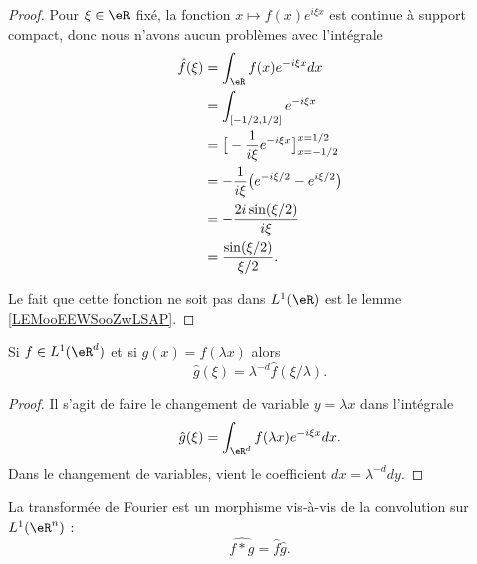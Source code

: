 \begin{proof}
	Pour \( \xi\in \eR\) fixé, la fonction \( x\mapsto f(x) e^{i\xi x}\) est continue à support compact, donc nous n'avons aucun problèmes avec l'intégrale
	\begin{subequations}
		\begin{align}
			\hat f(\xi) & =\int_{\eR}f(x) e^{-i\xi x}dx                               \\
			            & =\int_{\mathopen[ -1/2 , 1/2 \mathclose]} e^{-i\xi x}       \\
			            & =\big[ -\frac{1}{ i\xi } e^{-i\xi x} \big]_{x=-1/2}^{x=1/2} \\
			            & =-\frac{1}{ i\xi }\big(  e^{-i\xi /2}- e^{i\xi /2} \big)    \\
			            & =-\frac{ 2i\sin(\xi/2) }{ i\xi }                            \\
			            & =\frac{ \sin(\xi/2) }{ \xi/2 }.
		\end{align}
	\end{subequations}

	Le fait que cette fonction ne soit pas dans \( L^1(\eR)\) est le lemme \ref{LEMooEEWSooZwLSAP}.
\end{proof}

\begin{lemma}       \label{LEMooKGDKooVXSMCn}
	Si \( f\in L^1(\eR^d)\) et si \( g(x)=f(\lambda x)\) alors
	\begin{equation}
		\hat g(\xi)=\lambda^{-d}\hat f(\xi/\lambda).
	\end{equation}
\end{lemma}

\begin{proof}
	Il s'agit de faire le changement de variable \( y=\lambda x\) dans l'intégrale
	\begin{equation}
		\hat g(\xi)=\int_{\eR^d}f(\lambda x) e^{-i\xi x}dx.
	\end{equation}
	Dans le changement de variables, vient le coefficient \( dx=\lambda^{-d}dy\).
\end{proof}

\begin{proposition}     \label{PropfqvLOl}
	La transformée de Fourier est un morphisme vis-à-vis de la convolution sur \( L^1(\eR^n)\) :
	\begin{equation}
		\widehat{f*g}=\hat f\hat g.
	\end{equation}
\end{proposition}

